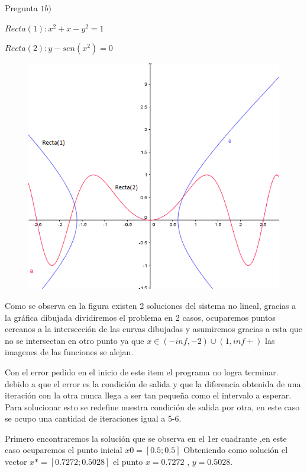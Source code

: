 \documentclass{udpreport}
\begin{document}
\begin{enumerate}
        \newpage    
        Pregunta $ 1b)$
        
            $ Recta(1) : x^2 + x -y^2=1 $
            
            $ Recta(2) : y-sen(x^2)=0  $
            
            \begin{figure}[h] \centering
            \includegraphics[width=12cm]{GraficoEcEj1b}
            \end{figure}
        Como se observa en la figura existen 2 soluciones del sistema no lineal, gracias a la gráfica dibujada dividiremos el problema en 2 casos, ocuparemos puntos cercanos a la intersección de las curvas dibujadas y asumiremos gracias a esta que no se intersectan en otro punto ya que  $ x \in (-inf,-2) \cup (1,inf+)$ las imagenes de las funciones se alejan.
        
        Con el error pedido en el inicio de este item el programa no logra terminar. debido a que el error es la condición de salida y que la diferencia  obtenida de una iteración con la otra nunca llega a ser tan pequeña como el intervalo a esperar. Para solucionar esto se redefine nuestra condición de salida por otra, en este caso se ocupo una cantidad de iteraciones igual a 5-6.
        
        Primero encontraremos la solución que se observa en el 1er cuadrante ,en este caso ocuparemos el punto inicial $x0 = [0.5;0.5]$ Obteniendo como solución el vector
        $ x*=[0.7272;0.5028] $ el punto $ x = 0.7272 $ , $ y = 0.5028$.
        

\end{enumerate}
\end{document}
